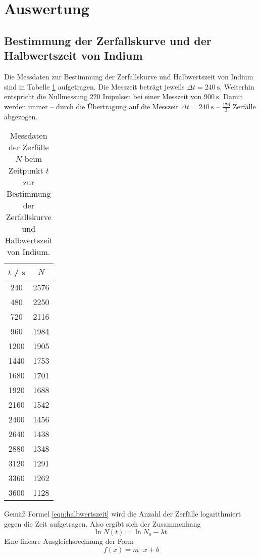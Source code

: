 \section{Auswertung}
\label{sec:Auswertung}

\subsection{Bestimmung der Zerfallskurve und der Halbwertszeit von Indium}
Die Messdaten zur Bestimmung der Zerfallskurve und Halbwertszeit von Indium sind in Tabelle
\ref{tab:indium} aufgetragen.
Die Messzeit beträgt jeweils $\Delta t = \SI{240}{\second}$.
Weiterhin entspricht die Nullmessung $220$ Impulsen bei einer Messzeit von $\SI{900}{\second}$.
Damit werden immer -- durch die Übertragung auf die Messzeit $\Delta t = \SI{240}{\second}$ --
$\frac{176}{3}$ Zerfälle abgezogen.
\begin{table}
	\centering
	\caption{Messdaten der Zerfälle $N$ beim Zeitpunkt $t$ zur Bestimmung der Zerfallskurve und Halbwertszeit von Indium.}
	\label{tab:indium}
	\begin{tabular}{cc}
		\toprule
		$t$ / $\si{\second}$ & $N$ \\
		\midrule
		240 & 2576 \\
		480 & 2250 \\
		720 & 2116 \\
		960 & 1984 \\
		1200 & 1905 \\
		1440 & 1753 \\
		1680 & 1701 \\
		1920 & 1688 \\
		2160 & 1542 \\
		2400 & 1456 \\
		2640 & 1438 \\
		2880 & 1348 \\
		3120 & 1291 \\
		3360 & 1262 \\
		3600 & 1128 \\
		\bottomrule
	\end{tabular}
\end{table}
Gemäß Formel \eqref{eqn:halbwertszeit} wird die Anzahl der Zerfälle logarithmiert gegen die
Zeit aufgetragen.
Also ergibt sich der Zusammenhang
\begin{equation}
	\label{eqn:Halbwertszeit2}
	\ln N(t) = \ln N_0 - \lambda t \mathrm{.}
\end{equation}
Eine lineare Ausgleichsrechnung der Form
\begin{equation*}
	f(x) = m \cdot x + b
\end{equation*}

